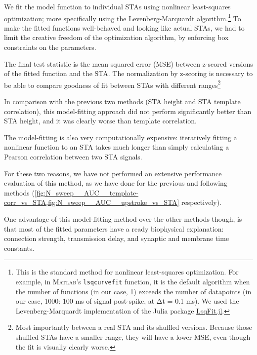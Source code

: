 We fit the model function to individual STAs using nonlinear least-squares optimization; more specifically using the Levenberg-Marquardt algorithm.\footnote{
    This is the standard method for nonlinear least-squares optimization. For example, in \textsc{Matlab}'s \texttt{lsqcurvefit} function,  it is the default algorithm when the number of functions (in our case, 1) exceeds the number of datapoints (in our case, 1000:  100 ms of signal post-spike, at Δt = 0.1 ms).\newline
    We used the Levenberg-Marquardt implementation of the Julia package \href{https://github.com/JuliaNLSolvers/LsqFit.jl}{LsqFit.jl}.
}
%
To make the fitted functions well-behaved and looking like actual STAs, we had to limit the creative freedom of the optimization algorithm, by enforcing box constraints on the parameters.

The final test statistic is the mean squared error (MSE) between z-scored versions of the fitted function and the STA. The normalization by z-scoring is necessary to be able to compare goodness of fit between STAs with different ranges\footnote{
    Most importantly between a real STA and its shuffled versions.
    Because those shuffled STAs have a smaller range, they will have a lower MSE, even though the fit is visually clearly worse.
}

In comparison with the previous two methods (STA height and STA template correlation), this model-fitting approach did not perform significantly better than STA height, and it was clearly worse than template correlation.

The model-fitting is also very computationally expensive: iteratively fitting a nonlinear function to an STA takes much longer than simply calculating a Pearson correlation between two STA signals.

For these two reasons, we have not performed an extensive performance evaluation of this method, as we have done for the previous and following methods (\cref{fig:N_sweep__AUC__template-corr_vs_STA,fig:N_sweep__AUC__upstroke_vs_STA} respectively).

One advantage of this model-fitting method over the other methods though, is that most of the fitted parameters have a ready biophysical explanation: connection strength, transmission delay, and synaptic and membrane time constants.







